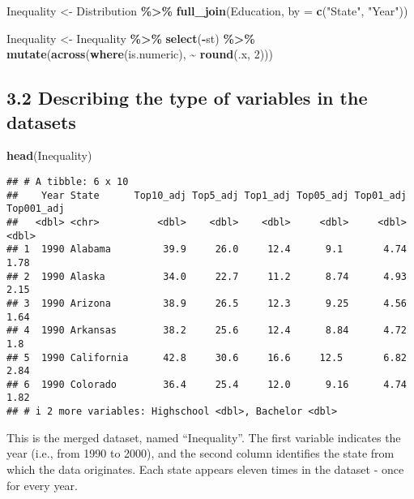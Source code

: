 \documentclass[
]{article}
\newenvironment{Shaded}{\begin{snugshade}}{\end{snugshade}}
\newcommand{\AttributeTok}[1]{\textcolor[rgb]{0.13,0.29,0.53}{#1}}
\newcommand{\DecValTok}[1]{\textcolor[rgb]{0.00,0.00,0.81}{#1}}
\newcommand{\FunctionTok}[1]{\textcolor[rgb]{0.13,0.29,0.53}{\textbf{#1}}}
\newcommand{\NormalTok}[1]{#1}
\newcommand{\OtherTok}[1]{\textcolor[rgb]{0.56,0.35,0.01}{#1}}
\newcommand{\SpecialCharTok}[1]{\textcolor[rgb]{0.81,0.36,0.00}{\textbf{#1}}}
\newcommand{\StringTok}[1]{\textcolor[rgb]{0.31,0.60,0.02}{#1}}
\begin{document}
\begin{Shaded}
\begin{Highlighting}[]
\NormalTok{Inequality }\OtherTok{\textless{}{-}}\NormalTok{ Distribution }\SpecialCharTok{\%\textgreater{}\%}
  \FunctionTok{full\_join}\NormalTok{(Education, }\AttributeTok{by =} \FunctionTok{c}\NormalTok{(}\StringTok{"State"}\NormalTok{, }\StringTok{"Year"}\NormalTok{))}

\NormalTok{Inequality }\OtherTok{\textless{}{-}}\NormalTok{ Inequality }\SpecialCharTok{\%\textgreater{}\%}
  \FunctionTok{select}\NormalTok{(}\SpecialCharTok{{-}}\NormalTok{st) }\SpecialCharTok{\%\textgreater{}\%}
  \FunctionTok{mutate}\NormalTok{(}\FunctionTok{across}\NormalTok{(}\FunctionTok{where}\NormalTok{(is.numeric), }\SpecialCharTok{\textasciitilde{}} \FunctionTok{round}\NormalTok{(.x, }\DecValTok{2}\NormalTok{)))}
\end{Highlighting}
\end{Shaded}

\subsection{3.2 Describing the type of variables in the
datasets}\label{describing-the-type-of-variables-in-the-datasets}

\begin{Shaded}
\begin{Highlighting}[]
\FunctionTok{head}\NormalTok{(Inequality)}
\end{Highlighting}
\end{Shaded}

\begin{verbatim}
## # A tibble: 6 x 10
##    Year State      Top10_adj Top5_adj Top1_adj Top05_adj Top01_adj Top001_adj
##   <dbl> <chr>          <dbl>    <dbl>    <dbl>     <dbl>     <dbl>      <dbl>
## 1  1990 Alabama         39.9     26.0     12.4      9.1       4.74       1.78
## 2  1990 Alaska          34.0     22.7     11.2      8.74      4.93       2.15
## 3  1990 Arizona         38.9     26.5     12.3      9.25      4.56       1.64
## 4  1990 Arkansas        38.2     25.6     12.4      8.84      4.72       1.8 
## 5  1990 California      42.8     30.6     16.6     12.5       6.82       2.84
## 6  1990 Colorado        36.4     25.4     12.0      9.16      4.74       1.82
## # i 2 more variables: Highschool <dbl>, Bachelor <dbl>
\end{verbatim}

This is the merged dataset, named ``Inequality''. The first variable
indicates the year (i.e., from 1990 to 2000), and the second column
identifies the state from which the data originates. Each state appears
eleven times in the dataset - once for every year.
\end{document}
